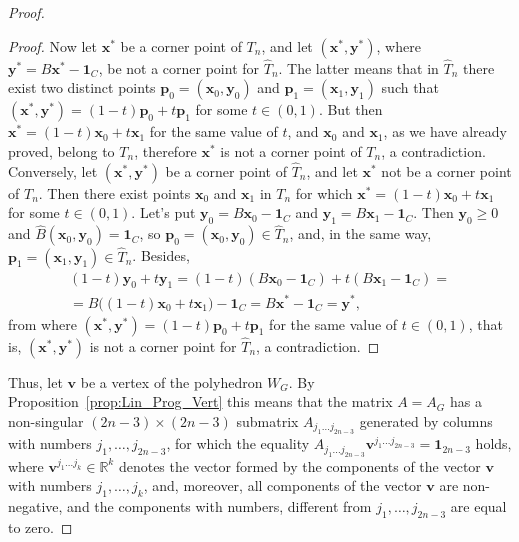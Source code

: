 \documentclass[10pt]{article}
\theoremstyle{plain}
\theoremstyle{definition}
\def\one{\mathbf{1}}
\def\bp{\boldsymbol{p}}
\def\bv{\boldsymbol{v}}
\def\bx{\boldsymbol{x}}
\def\by{\boldsymbol{y}}
\def\hB{{\widehat{B}}}
\def\hT{{\widehat{T}}}
\newcommand{\R}{{\mathbb R}}
\begin{document}
\begin{proof}
\begin{proof}
Now let $\bx^*$ be a corner point of $T_n$, and let $(\bx^*,\by^*)$, where $\by^*=B\bx^*-\one_C$, be not a corner point for $\hT_n$. The latter means that in $\hT_n$ there exist two distinct points $\bp_0=(\bx_0,\by_0)$ and $\bp_1=(\bx_1,\by_1)$ such that $(\bx^*,\by^*)=(1-t)\bp_0+t\bp_1$ for some $t\in(0,1)$. But then $\bx^*=(1-t)\bx_0+t\bx_1$ for the same value of $t$, and $\bx_0$ and $\bx_1$, as we have already proved, belong to $T_n$, therefore $\bx^*$ is not a corner point of $T_n$, a contradiction. Conversely, let $(\bx^*,\by^*)$ be a corner point of $\hT_n$, and let $\bx^*$ not be a corner point of $T_n$. Then there exist points $\bx_0$ and $\bx_1$ in $T_n$ for which $\bx^*=(1-t)\bx_0+t\bx_1$ for some $t\in(0,1)$. Let's put $\by_0=B\bx_0-\one_C$ and $\by_1=B\bx_1-\one_C$. Then $\by_0\ge0$ and $\hB(\bx_0,\by_0)=\one_C$, so $\bp_0=(\bx_0,\by_0)\in\hT_n$, and, in the same way, $\bp_1=(\bx_1,\by_1)\in\hT_n$. Besides,
\begin{multline*}
(1-t)\by_0+t\by_1=(1-t)(B\bx_0-\one_C)+t(B\bx_1-\one_C)=\\
=B\big((1-t)\bx_0+t\bx_1\big)-\one_C=B\bx^*-\one_C=\by^*,
\end{multline*}
from where $(\bx^*,\by^*)=(1-t)\bp_0+t\bp_1$ for the same value of $t\in(0,1)$, that is, $(\bx^*,\by^*)$ is not a corner point for $\hT_n$, a contradiction.
\end{proof}

Thus, let $\bv$ be a vertex of the polyhedron $W_G$. By Proposition~\ref{prop:Lin_Prog_Vert} this means that the matrix $A=A_G$ has a non-singular $(2n-3)\times(2n-3)$ submatrix $A_{j_1\ldots j_{2n-3}}$ generated by columns with numbers $j_1,\ldots,j_{2n-3}$, for which the equality $A_{j_1\ldots j_{2n-3}}\bv^{j_1\ldots j_{2n-3}}=\one_{2n-3}$ holds, where $\bv^{j_1\ldots j_k}\in\R^k$ denotes the vector formed by the components of the vector $\bv$ with numbers $j_1,\ldots,j_k$, and, moreover, all components of the vector $\bv$ are non-negative, and the components with numbers, different from $j_1,\ldots, j_{2n-3}$ are equal to zero.


\end{proof}
\end{document}
